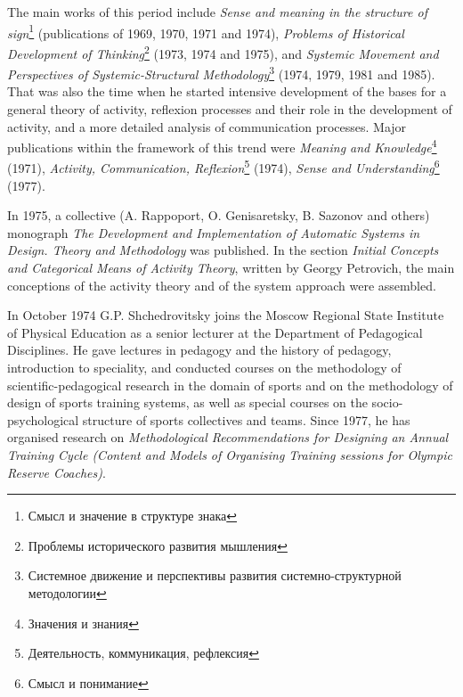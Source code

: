 \documentclass[a4paper,11pt]{article}
\begin{document}
The main works of this period include \emph{Sense and meaning in the structure
  of sign}\footnote{\foreignlanguage{russian}{Смысл и значение в структуре
    знака}} (publications of 1969, 1970, 1971 and 1974), \emph{Problems of
  Historical Development of
  Thinking}\footnote{\foreignlanguage{russian}{Проблемы исторического развития
    мышления}} (1973, 1974 and 1975), and \emph{Systemic Movement and
  Perspectives of Systemic-Structural
  Methodology}\footnote{\foreignlanguage{russian}{Системное движение и
    перспективы развития системно-структурной методологии}} (1974, 1979, 1981
and 1985). That was also the time when he started intensive development of the
bases for a general theory of activity, reflexion processes and their role in
the development of activity, and a more detailed analysis of communication
processes. Major publications within the framework of this trend were
\emph{Meaning and Knowledge}\footnote{\foreignlanguage{russian}{Значения и
    знания}} (1971), \emph{Activity, Communication,
  Reflexion}\footnote{\foreignlanguage{russian}{Деятельность, коммуникация,
    рефлексия}} (1974), \emph{Sense and
  Understanding}\footnote{\foreignlanguage{russian}{Смысл и понимание}}
(1977).

In 1975, a collective (A. Rappoport, O. Genisaretsky, B. Sazonov and others)
monograph \emph{The Development and Implementation of Automatic Systems in
  Design. Theory and Methodology} was published. In the section \emph{Initial
  Concepts and Categorical Means of Activity Theory}, written by Georgy
Petrovich, the main conceptions of the activity theory and of the system
approach were assembled.

In October 1974 G.P. Shchedrovitsky joins the Moscow Regional State Institute
of Physical Education as a senior lecturer at the Department of Pedagogical
Disciplines. He gave lectures in pedagogy and the history of pedagogy,
introduction to speciality, and conducted courses on the methodology of
scientific-pedagogical research in the domain of sports and on the methodology
of design of sports training systems, as well as special courses on the
socio-psychological structure of sports collectives and teams. Since 1977, he
has organised research on \emph{Methodological Recommendations for Designing
  an Annual Training Cycle (Content and Models of Organising Training sessions
  for Olympic Reserve Coaches)}.
\end{document}
